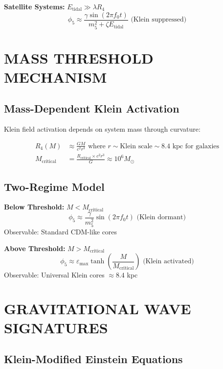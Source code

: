 \documentclass[12pt,a4paper]{article}
\begin{document}
\textbf{Satellite Systems:} $E_{\text{tidal}} \gg \lambda R_4$
\begin{equation}
\phi_5 \approx \frac{\gamma \sin(2\pi f_0 t)}{m_5^2 + \zeta E_{\text{tidal}}} \text{ (Klein suppressed)}
\end{equation}

\section{MASS THRESHOLD MECHANISM}

\subsection{Mass-Dependent Klein Activation}

Klein field activation depends on system mass through curvature:

\begin{align}
R_4(M) &\approx \frac{GM}{c^2r^3} \text{ where } r \sim \text{Klein scale} \sim 8.4 \text{ kpc for galaxies}\\
M_{\text{critical}} &= \frac{R_{\text{critical}} \times c^2r^3}{G} \approx 10^6 M_\odot
\end{align}

\subsection{Two-Regime Model}

\textbf{Below Threshold:} $M < M_{\text{critical}}$
\begin{equation}
\phi_5 \approx \frac{\gamma}{m_5^2} \sin(2\pi f_0 t) \text{ (Klein dormant)}
\end{equation}
Observable: Standard CDM-like cores

\textbf{Above Threshold:} $M > M_{\text{critical}}$
\begin{equation}
\phi_5 \approx \varepsilon_{\max} \tanh\left(\frac{M}{M_{\text{critical}}}\right) \text{ (Klein activated)}
\end{equation}
Observable: Universal Klein cores $\approx 8.4$ kpc

\section{GRAVITATIONAL WAVE SIGNATURES}

\subsection{Klein-Modified Einstein Equations}
\end{document}
